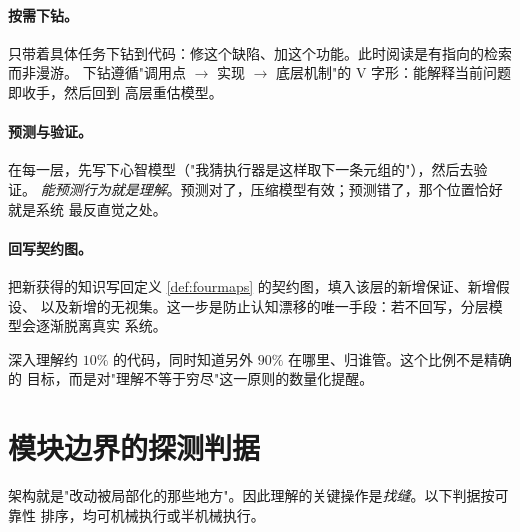 \paragraph{按需下钻。}
只带着具体任务下钻到代码：修这个缺陷、加这个功能。此时阅读是有指向的检索而非漫游。
下钻遵循"调用点 $\to$ 实现 $\to$ 底层机制"的 V 字形：能解释当前问题即收手，然后回到
高层重估模型。

\paragraph{预测与验证。}
在每一层，先写下心智模型（"我猜执行器是这样取下一条元组的"），然后去验证。
\emph{能预测行为就是理解}。预测对了，压缩模型有效；预测错了，那个位置恰好就是系统
最反直觉之处。

\paragraph{回写契约图。}
把新获得的知识写回定义 \ref{def:fourmaps} 的契约图，填入该层的新增保证、新增假设、
以及新增的无视集。这一步是防止认知漂移的唯一手段：若不回写，分层模型会逐渐脱离真实
系统。

\begin{remark}[一个可操作的比例]
深入理解约 $10\%$ 的代码，同时知道另外 $90\%$ 在哪里、归谁管。这个比例不是精确的
目标，而是对"理解不等于穷尽"这一原则的数量化提醒。
\end{remark}

\section{模块边界的探测判据}\label{sec:seams}

架构就是"改动被局部化的那些地方"。因此理解的关键操作是\emph{找缝}。以下判据按可靠性
排序，均可机械执行或半机械执行。

